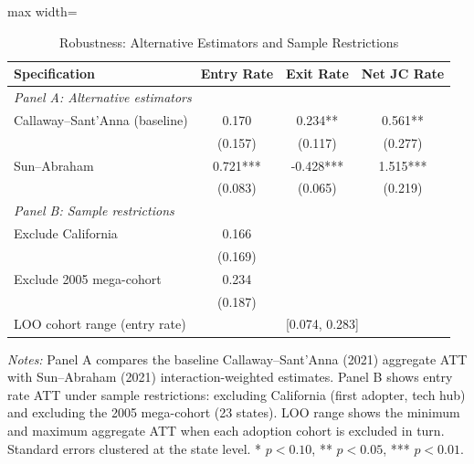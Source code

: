 \begin{table}[H]
\centering
\caption{Robustness: Alternative Estimators and Sample Restrictions}
\label{tab:robustness}
\begin{threeparttable}
\begin{adjustbox}{max width=\textwidth}
\begin{tabular}{lccc}
\toprule
Specification & Entry Rate & Exit Rate & Net JC Rate \\
\midrule
\multicolumn{4}{l}{\textit{Panel A: Alternative estimators}} \\
Callaway--Sant'Anna (baseline) & 0.170 & 0.234** & 0.561** \\
& (0.157) & (0.117) & (0.277) \\[3pt]
Sun--Abraham & 0.721*** & -0.428*** & 1.515*** \\
& (0.083) & (0.065) & (0.219) \\[6pt]
\multicolumn{4}{l}{\textit{Panel B: Sample restrictions}} \\
Exclude California & 0.166 & & \\
& (0.169) & & \\[3pt]
Exclude 2005 mega-cohort & 0.234 & & \\
& (0.187) & & \\[3pt]
\midrule
LOO cohort range (entry rate) & \multicolumn{3}{c}{[0.074, 0.283]} \\
\bottomrule
\end{tabular}
\end{adjustbox}
\begin{tablenotes}[flushleft]
\small
\item \textit{Notes:} Panel A compares the baseline Callaway--Sant'Anna (2021) aggregate ATT with Sun--Abraham (2021) interaction-weighted estimates. Panel B shows entry rate ATT under sample restrictions: excluding California (first adopter, tech hub) and excluding the 2005 mega-cohort (23 states). LOO range shows the minimum and maximum aggregate ATT when each adoption cohort is excluded in turn. Standard errors clustered at the state level. * $p<0.10$, ** $p<0.05$, *** $p<0.01$.
\end{tablenotes}
\end{threeparttable}
\end{table}
